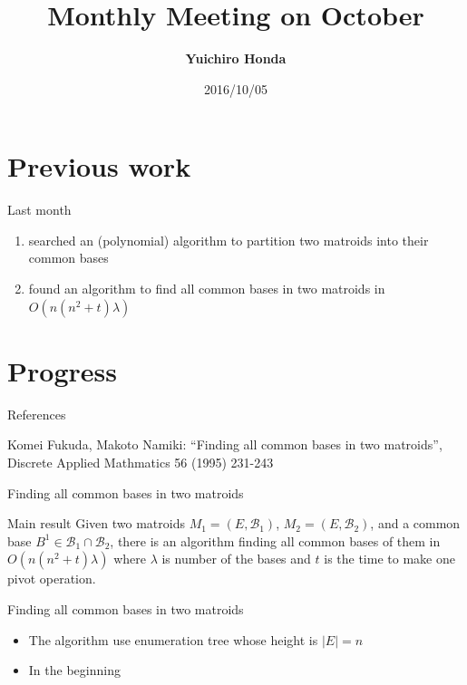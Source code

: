 \documentclass[11pt,xcolor=dvipsnames,table,dvipdfmx]{beamer}
\title{Monthly Meeting on October}
\author{\textbf{Yuichiro Honda}}
\date{2016/10/05}
\institute{Morita lab. M1}
\begin{document}
\maketitle

\section{Previous work}
\begin{frame}{Last month}
 \begin{enumerate}
  \item searched an (polynomial) algorithm to partition two matroids into their common bases
  \item found an algorithm to find all common bases in two matroids in $O(n(n^2+t)\lambda)$
 \end{enumerate}
\end{frame}



\section{Progress}
\begin{frame}{References}
 \begin{thebibliography}{9}
	\small{Komei Fukuda, Makoto Namiki: ``Finding all common bases in two matroids'', Discrete Applied Mathmatics 56 (1995) 231-243}
 \end{thebibliography}
\end{frame}

\begin{frame}{Finding all common bases in two matroids}
 \begin{block}{Main result}
  Given two matroids $M_1 = (E, \mathcal{B}_1)$, $M_2 = (E, \mathcal{B}_2)$, and a common base $B^1 \in \mathcal{B}_1 \cap \mathcal{B}_2$, there is an algorithm finding all common bases of them in \alert{$O(n(n^2+t)\lambda)$ }where $\lambda$ is number of the bases and $t$ is the time to make one pivot operation.
 \end{block}
\end{frame}

\begin{frame}{Finding all common bases in two matroids}
 \begin{itemize}
  \item The algorithm use enumeration tree whose height is $|E| = n$
  \item In the beginning
 \end{itemize}
\end{frame}
\end{document}
